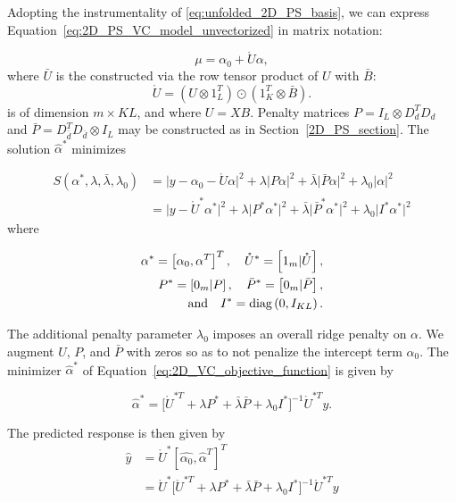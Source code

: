 \documentclass[12pt]{article}
\theoremstyle{definition}
\begin{document}
Adopting the instrumentality of \ref{eq:unfolded_2D_PS_basis}, we can express Equation~\ref{eq:2D_PS_VC_model_unvectorized} in matrix notation:

\[
\mu = \alpha_0 + \mathring{U} \alpha,
\]
\noindent
where $\bar{U}$ is the constructed via the row tensor product of $U$ with $\bar{B}$:
\begin{equation} \label{eq:2D_PS_VC_basis_vectorized}
\mathring{U} = \left( U \otimes 1^T_L \right) \odot \left( 1^T_K \otimes \bar{B} \right).
\end{equation}
\noindent
is of dimension $m \times KL$, and where $U = XB$. Penalty matrices $P = I_L \otimes D_d^T D_d$ and $\bar{P} = D_{\bar{d}}^T D_{\bar{d}} \otimes I_L$ may be constructed as in Section~\ref{2D_PS_section}. The solution $\hat{\alpha}^*$ minimizes

\begin{align} 
S\left(\alpha^*, \lambda,\bar{\lambda},\lambda_0\right) &= \vert y - \alpha_0 - \mathring{U} \alpha \vert^2 + \lambda \vert P \alpha \vert^2 +  \bar{\lambda} \vert \bar{P} \alpha \vert^2 +  \lambda_0 \vert  \alpha \vert^2 \nonumber\\
&= \vert y - \mathring{U}^* \alpha^* \vert^2 + \lambda \vert P^* \alpha^* \vert^2 +  \bar{\lambda} \vert \bar{P}^* \alpha^* \vert^2 +  \lambda_0 \vert I^* \alpha^* \vert^2 \label{eq:2D_VC_objective_function}
\end{align}
\noindent
where 

\begin{align*}
\alpha^* = \left[ \alpha_0, \alpha^T \right]^T, \quad \mathring{U}^* = \left[ 1_m \vert \mathring{U} \right],\\
 P^* = \left[ 0_m \vert P \right], \quad \bar{P}^* = \left[ 0_m \vert \bar{P} \right],\\
 \mbox{and} \quad I^* = \textup{diag}\left(0, I_{KL}\right).
\end{align*}

The additional penalty parameter $\lambda_0$ imposes an overall ridge penalty on $\alpha$. We augment $U$, $P$, and $\bar{P}$ with zeros so as to not penalize the intercept term $\alpha_0$. The minimizer $\hat{\alpha}^*$ of Equation~\ref{eq:2D_VC_objective_function} is given by 

\begin{equation*}
\hat{\alpha}^* = \big[\mathring{U}^{*T} + \lambda P^* + \bar{\lambda}\bar{P} + \lambda_0 I^* \big]^{-1}\mathring{U}^{*T}y.
\end{equation*}

The predicted response is then given by 
\begin{align*}
\hat{y} &= \mathring{U}^* \left[ \hat{\alpha_0},\hat{\alpha}^T \right]^T \\
&= \mathring{U}^* \big[\mathring{U}^{*T} + \lambda P^* + \bar{\lambda}\bar{P} + \lambda_0 I^* \big]^{-1}\mathring{U}^{*T}y \\
\end{align*}
\end{document}
